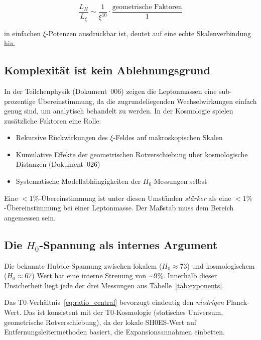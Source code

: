 \begin{equation}
    \frac{L_H}{L_\xi} \sim \frac{1}{\xi^{10}} \cdot \frac{\text{geometrische Faktoren}}{1}
\end{equation}

in einfachen $\xi$-Potenzen ausdrückbar ist, deutet auf eine echte
Skalenverbindung hin.

\subsection{Komplexität ist kein Ablehnungsgrund}

In der Teilchenphysik (Dokument~006) zeigen die Leptonmassen eine
sub-prozentige Übereinstimmung, da die zugrundeliegenden Wechselwirkungen
einfach genug sind, um analytisch behandelt zu werden. In der Kosmologie
spielen zusätzliche Faktoren eine Rolle:

\begin{itemize}
    \item Rekursive Rückwirkungen des $\xi$-Feldes auf makroskopischen Skalen
    \item Kumulative Effekte der geometrischen Rotverschiebung über
          kosmologische Distanzen (Dokument~026)
    \item Systematische Modellabhängigkeiten der $H_0$-Messungen selbst
\end{itemize}

Eine $<1\%$-Übereinstimmung ist unter diesen Umständen
\emph{stärker} als eine $<1\%$-Übereinstimmung bei einer Leptonmasse.
Der Maßstab muss dem Bereich angemessen sein.

\subsection{Die \texorpdfstring{$H_0$}{H0}-Spannung als internes Argument}

Die bekannte Hubble-Spannung zwischen lokalem ($H_0 \approx 73$) und
kosmologischem ($H_0 \approx 67$) Wert hat eine interne Streuung von $\sim
9\%$. Innerhalb dieser Unsicherheit liegt jede der drei Messungen aus
Tabelle~\ref{tab:exponents}.

Das T0-Verhältnis~\eqref{eq:ratio_central} bevorzugt eindeutig den
\emph{niedrigen} Planck-Wert. Das ist konsistent mit der T0-Kosmologie
(statisches Universum, geometrische Rotverschiebung), da der lokale
SH0ES-Wert auf Entfernungsleitermethoden basiert, die Expansionsannahmen
einbetten.

